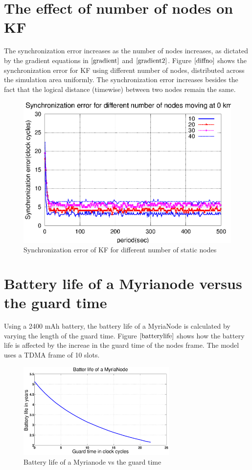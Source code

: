 \documentclass[a4paper,10pt]{report}
\begin{document}
\section{\textbf{The effect of number of nodes on KF}}
The synchronization error increases as the number of nodes increases, as dictated by the gradient equations in $\cite{gradient}$ and $\cite{gradient2}$. Figure $\ref{diffno}$ shows the synchronization error for KF using different number of nodes, distributed across the simulation area uniformly. The synchronization error increases besides the fact that the logical distance (timewise) between two nodes remain the same.
\begin{figure}[!h]
\centering
\includegraphics[width= 0.7 \textwidth]{diffno}
\caption{Synchronization error of KF for different number of static nodes}
\label{diffno}
\end{figure}
\section{\textbf{Battery life of a Myrianode versus the guard time}}
Using a 2400 mAh battery, the battery life of a MyriaNode is calculated by varying the length of the guard time. Figure $\ref{batterylife}$ shows how the battery life is affected by the increae in the guard time of the nodes frame. The model uses a TDMA frame of 10 slots.
\begin{figure}[!h]
\centering
\includegraphics[width = 0.7\textwidth]{guardsave}
\caption{Battery life of a Myrianode vs the guard time}
\label{batterylife}
\end{figure}
\end{document}
